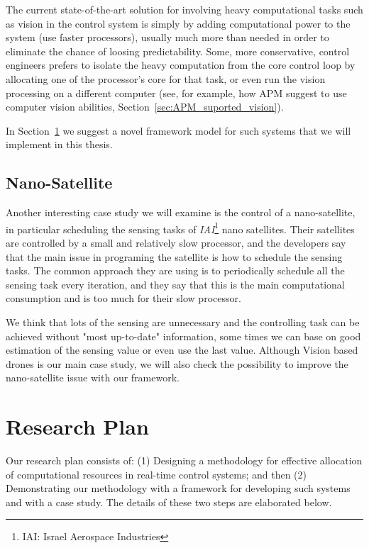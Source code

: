 \documentclass[11pt]{article}
\begin{document}
The current state-of-the-art solution for involving heavy computational tasks such as vision in the control system is simply by adding computational power to the system (use faster processors), usually much more than needed in order to eliminate the chance of loosing predictability.
Some, more conservative, control engineers prefers to isolate the heavy computation from the core control loop by allocating one of the processor's core for that task, or even run the vision processing on a different computer (see, for example, how APM suggest to use computer vision abilities, Section~\ref{sec:APM_suported_vision}).


In Section~\ref{sec:Research Plan} we suggest a novel framework model for such systems that we will implement in this thesis.

\subsection{Nano-Satellite}
Another interesting case study we will examine is the control of a nano-satellite, in particular scheduling the sensing tasks of \textit{IAI}\footnote{IAI: Israel Aerospace Industries} nano satellites. Their satellites are controlled by a small and relatively slow processor, and the developers say that the main issue in programing the satellite is how to schedule the sensing tasks.
The common approach they are using is to periodically schedule all the sensing task every iteration, and they say that this is the main computational consumption and is too much for their slow processor.

We think that lots of the sensing are unnecessary and the controlling task can be achieved without "most up-to-date" information, some times we can base on good estimation of the sensing value or even use the last value. Although Vision based drones is our main case study, we will also check the possibility to improve the nano-satellite issue with our framework.

\section{Research Plan}
\label{sec:Research Plan}

Our research plan consists of: (1) Designing a methodology for effective allocation of computational resources in real-time control systems; and then (2) Demonstrating our methodology with a framework for developing such systems and with a case study. The details of these two steps are elaborated below.
\end{document}
